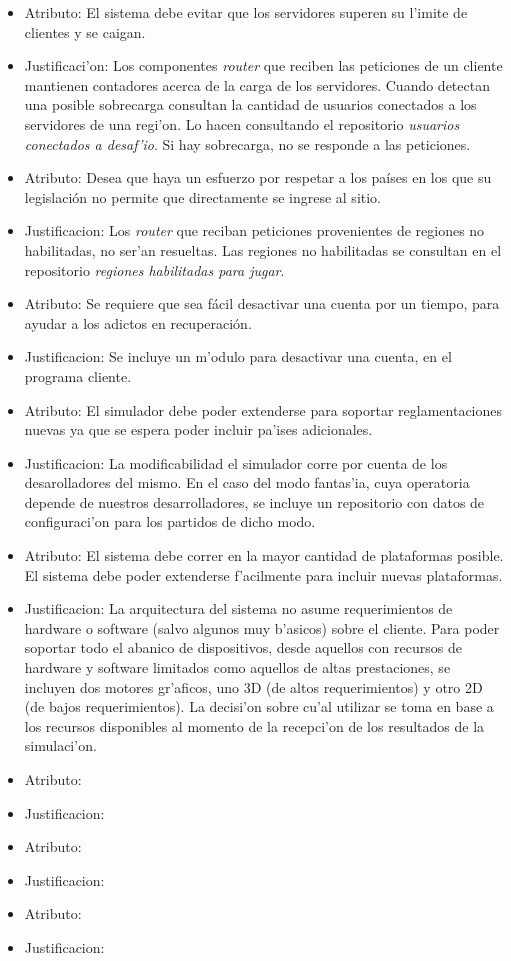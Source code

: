 \begin{itemize}
\item Atributo: El sistema debe evitar que los servidores superen su l'imite de clientes y se caigan.
\item Justificaci'on: Los componentes \textit{router} que reciben las peticiones de un cliente mantienen contadores acerca de la carga de los servidores. Cuando detectan una posible sobrecarga consultan la cantidad de usuarios conectados a los servidores de una regi'on. Lo hacen consultando el repositorio \textit{usuarios conectados a desaf'io}. Si hay sobrecarga, no se responde a las peticiones.

\item Atributo: Desea que haya un esfuerzo por respetar a los países en los que su legislación no permite que directamente se ingrese al sitio.
\item Justificacion: Los \textit{router} que reciban peticiones provenientes de regiones no habilitadas, no ser'an resueltas. Las regiones no habilitadas se consultan en el repositorio \textit{regiones habilitadas para jugar}.

\item Atributo: Se requiere que sea fácil desactivar una cuenta por un tiempo, para ayudar a los adictos en recuperación.
\item Justificacion: Se incluye un m'odulo para desactivar una cuenta, en el programa cliente.

\item Atributo: El simulador debe poder extenderse para soportar reglamentaciones nuevas ya que se espera poder incluir pa'ises adicionales.
\item Justificacion: La modificabilidad el simulador corre por cuenta de los desarolladores del mismo. En el caso del modo fantas'ia, cuya operatoria depende de nuestros desarrolladores, se incluye un repositorio con datos de configuraci'on para los partidos de dicho modo.

\item Atributo: El sistema debe correr en la mayor cantidad de plataformas posible. El sistema debe poder extenderse f'acilmente para incluir nuevas plataformas.
\item Justificacion: La arquitectura del sistema no asume requerimientos de hardware o software (salvo algunos muy b'asicos) sobre el cliente. Para poder soportar todo el abanico de dispositivos, desde aquellos con recursos de hardware y software limitados como aquellos de altas prestaciones, se incluyen dos motores gr'aficos, uno 3D (de altos requerimientos) y otro 2D (de bajos requerimientos). La decisi'on sobre cu'al utilizar se toma en base a los recursos disponibles al momento de la recepci'on de los resultados de la simulaci'on.

\item Atributo: 
\item Justificacion:

\item Atributo: 
\item Justificacion:

\item Atributo: 
\item Justificacion:
\end{itemize}

